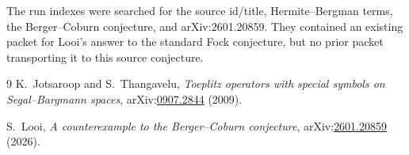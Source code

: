 \documentclass[11pt]{article}
\begin{document}
The run indexes were searched for the source id/title, Hermite--Bergman
terms, the Berger--Coburn conjecture, and arXiv:2601.20859.  They contained an
existing packet for Looi's answer to the standard Fock conjecture, but no
prior packet transporting it to this source conjecture.

\begin{thebibliography}{9}
K.~Jotsaroop and S.~Thangavelu,
\emph{Toeplitz operators with special symbols on Segal--Bargmann spaces},
arXiv:\href{https://arxiv.org/abs/0907.2844}{0907.2844} (2009).

S.~Looi,
\emph{A counterexample to the Berger--Coburn conjecture},
arXiv:\href{https://arxiv.org/abs/2601.20859}{2601.20859} (2026).
\end{thebibliography}
\end{document}
